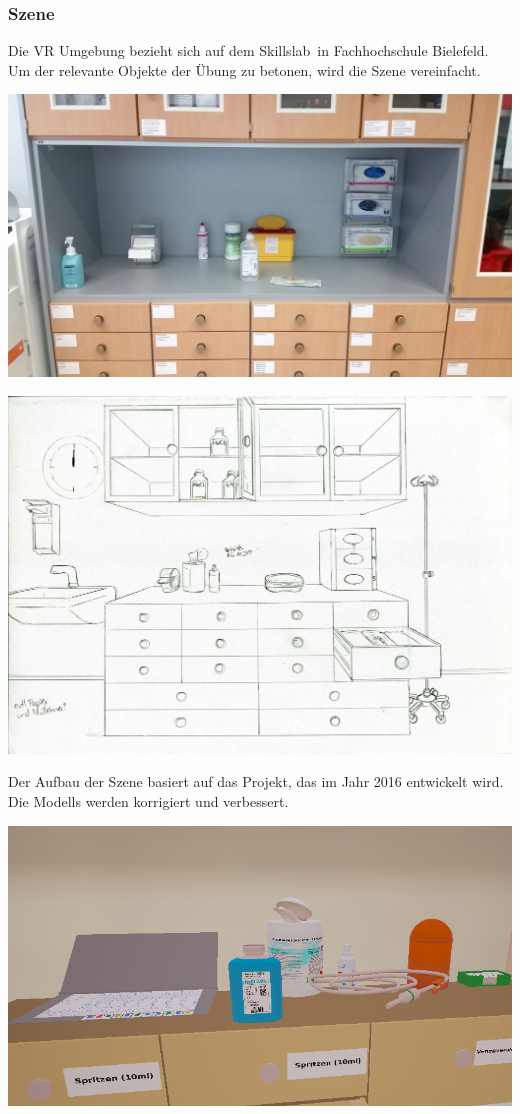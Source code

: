   \subsubsection{Szene}
  Die VR Umgebung bezieht sich auf dem \glqq Skillslab\grqq\ in Fachhochschule Bielefeld. Um der relevante Objekte der Übung zu betonen, wird die Szene vereinfacht.
  
  \includegraphics[width=\textwidth]{images/RealLabor.jpg}
  
  \includegraphics[width=\textwidth]{images/paperPrototype2.jpg}
  
  Der Aufbau der Szene basiert auf das Projekt, das im Jahr 2016 entwickelt wird\citep{26}. Die Modells werden korrigiert und verbessert.
  
  \includegraphics[width=\textwidth]{images/WithoutGlass.png}

